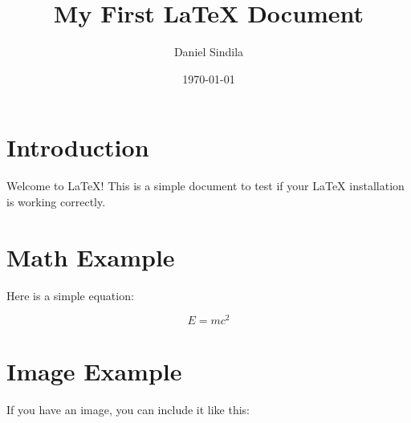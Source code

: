 \documentclass{article}
\title{My First LaTeX Document}
\author{Daniel Sindila}
\date{\today}
\begin{document}
\maketitle

\section{Introduction}
Welcome to \LaTeX! This is a simple document to test if your LaTeX installation is working correctly.

\section{Math Example}
Here is a simple equation:

\begin{equation}
    E = mc^2
\end{equation}

\section{Image Example}
If you have an image, you can include it like this:
\end{document}
